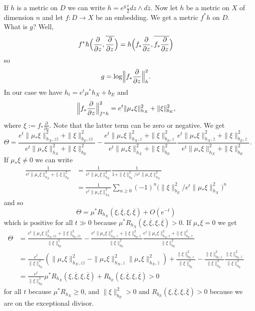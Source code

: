 \documentclass[11pt]{article}
\theoremstyle{definition}
\def\ov#1{\overline{#1}}
\begin{document}
If $h$ is a metric on $D$ we can write $h = e^g \frac i2 dz \wedge d\bar z$.
Now let $h$ be a metric on $X$ of dimension $n$ and let $f : D \to X$ be an embedding.
We get a metric $f^*h$ on $D$.
What is $g$?
Well,
$$
f^*h\Bigl(\frac{\partial}{\partial z},\ov{\frac{\partial}{\partial z}}\Bigr)
= h\Bigl(f_*\frac{\partial}{\partial z}, \ov{f_*\frac{\partial}{\partial z}}\Bigr)
$$
so
$$
g = \log \Bigl\|f_*\frac{\partial}{\partial z}\Bigr\|_h^2.
$$
In our case we have $h_t = e^t \mu^*h_X + b_E$ and
$$
\Bigl\|f_*\frac{\partial}{\partial z}\Bigr\|_{f^*h}^2
= e^t\|\mu_*\xi\|_{h_X}^2 + \|\xi\|^2_{b_E},
$$
where $\xi := f_*\frac{\partial}{\partial z}$.
Note that the latter term can be zero or negative.
We get
$$
\Theta
= \frac{e^t\|\mu_*\xi\|_{h_X,z\bar z}^2 + \|\xi\|^2_{b_E,z \bar z} }
{e^t\|\mu_*\xi\|_{h_X}^2 + \|\xi\|^2_{b_E}}
- \frac{e^t\|\mu_*\xi\|_{h_X,z}^2 + \|\xi\|^2_{b_E,z} }
{e^t\|\mu_*\xi\|_{h_X}^2 + \|\xi\|^2_{b_E}}
\frac{e^t\|\mu_*\xi\|_{h_X,\bar z}^2 + \|\xi\|^2_{b_E, \bar z} }
{ e^t\|\mu_*\xi\|_{h_X}^2 + \|\xi\|^2_{b_E} }
.
$$
If $\mu_*\xi \not= 0$ we can write
\begin{align*}
\frac{1}{ e^t\|\mu_*\xi\|_{h_X}^2 + \|\xi\|^2_{b_E} }
&= \frac{1}{e^t\|\mu_*\xi\|_{h_X}^2}
\frac{1}{1 + \|\xi\|^2_{b_E} / e^t\|\mu_*\xi\|_{h_X}^2}
\\
&= \frac{1}{e^t\|\mu_*\xi\|_{h_X}^2}
\sum_{n \geq 0} (-1)^n \bigl(
\|\xi\|^2_{b_E} / e^t\|\mu_*\xi\|_{h_X}^2
\bigr)^n
\end{align*}
and so
$$
\Theta
= \mu^*R_{h_X}(\xi, \ov \xi, \xi, \ov \xi) + O(e^{-t})
$$
which is positive for all $t \gg 0$ because $\mu^*R_{h_X}(\xi, \ov \xi, \xi,
\ov \xi) > 0$.
If $\mu_*\xi = 0$ we get
\begin{align*}
\Theta
&= \frac{e^t\|\mu_*\xi\|_{h_X,z\bar z}^2 + \|\xi\|^2_{b_E,z \bar z} }
{\|\xi\|^2_{b_E}}
- \frac{e^t\|\mu_*\xi\|_{h_X,z}^2 + \|\xi\|^2_{b_E,z} }{\|\xi\|^2_{b_E}}
\frac{e^t\|\mu_*\xi\|_{h_X,\bar z}^2 + \|\xi\|^2_{b_E,\bar z} }{\|\xi\|^2_{b_E}}
\\
&=\frac{e^t}{\|\xi\|^2_{b_E}}
(\|\mu_*\xi\|_{h_X,z\bar z}^2 - \|\mu_*\xi\|_{h_X,z}^2 \|\mu_*\xi\|_{h_X,\bar z}^2 )
+
\frac{\|\xi\|^2_{b_E,z}}{\|\xi\|^2_{b_E}}
- \frac{\|\xi\|^2_{b_E,z} }{\|\xi\|^2_{b_E}}
\frac{\|\xi\|^2_{b_E,\bar z} }{\|\xi\|^2_{b_E}}
\\
&=
\frac{e^t}{\|\xi\|^2_{b_E}}\mu^*R_{h_X}(\xi, \ov \xi, \xi, \ov \xi)
+ R_{b_E}(\xi, \ov \xi, \xi, \ov \xi)
> 0
\end{align*}
for all $t$ because $\mu^*R_{h_X} \geq 0$, and $\|\xi\|^2_{b_E} > 0$ and
$R_{b_E}(\xi, \ov \xi, \xi, \ov \xi) > 0$ because we are
on the exceptional divisor.
\end{document}
